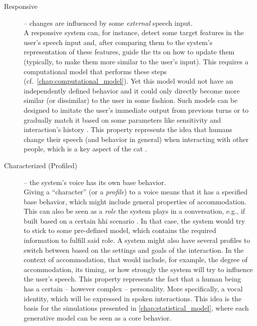\begin{description}
	\item[Responsive] -- changes are influenced by some \emph{external} speech input.\\
	A responsive system can, for instance, detect some target features in the user's speech input and, after comparing them to the system's representation of these features, guide the \ac{tts} on how to update them (typically, to make them more similar to the user's input).
	This requires a computational model that performs these steps (cf.\ \cref{chap:computational_model}).
	Yet this model would not have an independently defined behavior and it could only directly become more similar (or dissimilar) to the user in some fashion.
	Such models can be designed to imitate the user's immediate output from previous turns \citep[like in][]{Levitan2016implementing} or to gradually match it based on some parameters like sensitivity and interaction's history \citep[as demonstrated in][]{Raveh2017Interspeech}.
	This property represents the idea that humans change their speech (and behavior in general) when interacting with other people, which is a key aspect of the \ac{cat} \citep[][and see \cref{sec:communication_accommodation_theory}]{Giles1991CAT}.
	
	\item[Characterized (Profiled)] -- the system's voice has its own base behavior.\\
	Giving a \enquote{character} (or a \emph{profile}) to a voice means that it has a specified base behavior, which might include general properties of accommodation.
	This can also be seen as a \emph{role} the system plays in a conversation, e.g., if built based on a certain \ac{hhi} scenario \citep{Silber-Varod2018prosodic}.
	In that case, the system would try to stick to some pre-defined model, which contains the required information to fulfill said role.
	A system might also have several profiles to switch between based on the settings and goals of the interaction.
	In the context of accommodation, that would include, for example, the degree of accommodation, its timing, or how strongly the system will try to influence the user's speech.
	This property represents the fact that a human being has a certain -- however complex -- personality.
	More specifically, a vocal identity, which will be expressed in spoken interactions.
	This idea is the basis for the simulations presented in \cref{chap:statistical_model}, where each generative model can be seen as a core behavior.
	

\end{description}
